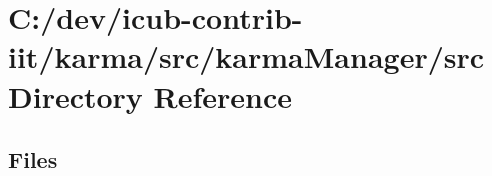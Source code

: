 \section{C\+:/dev/icub-\/contrib-\/iit/karma/src/karma\+Manager/src Directory Reference}
\label{dir_7487e53a8124ea55fc67b4fc4eb7b40c}
\subsection*{Files}
\begin{DoxyCompactItemize}
\end{DoxyCompactItemize}
